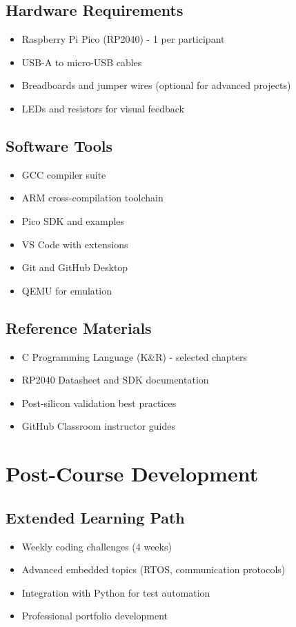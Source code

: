 \documentclass[11pt,a4paper]{article}
\begin{document}
\subsection{Hardware Requirements}
\begin{itemize}
    \item Raspberry Pi Pico (RP2040) - 1 per participant
    \item USB-A to micro-USB cables
    \item Breadboards and jumper wires (optional for advanced projects)
    \item LEDs and resistors for visual feedback
\end{itemize}

\subsection{Software Tools}
\begin{itemize}
    \item GCC compiler suite
    \item ARM cross-compilation toolchain
    \item Pico SDK and examples
    \item VS Code with extensions
    \item Git and GitHub Desktop
    \item QEMU for emulation
\end{itemize}

\subsection{Reference Materials}
\begin{itemize}
    \item C Programming Language (K\&R) - selected chapters
    \item RP2040 Datasheet and SDK documentation
    \item Post-silicon validation best practices
    \item GitHub Classroom instructor guides
\end{itemize}

\section{Post-Course Development}

\subsection{Extended Learning Path}
\begin{itemize}
    \item Weekly coding challenges (4 weeks)
    \item Advanced embedded topics (RTOS, communication protocols)
    \item Integration with Python for test automation
    \item Professional portfolio development
\end{itemize}
\end{document}
